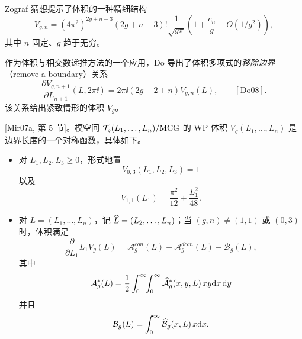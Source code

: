 
Zograf 猜想提示了体积的一种精细结构
\[
V_{g,n}=(4\pi^2)^{2g+n-3}(2g+n-3)!\frac{1}{\sqrt{g\pi}}\left(1+\frac{c_n}{g}+O(1/g^2)\right),
\]
其中 $n$ 固定、$g$ 趋于无穷。


作为体积与相交数递推方法的一个应用，Do 导出了体积多项式的\emph{移除边界}（remove a boundary）关系
\[
\frac{\partial V_{g,n+1}}{\partial L_{n+1}}(L,2\pi\ii)=2\pi\ii(2g-2+n)V_{g,n}(L),\qquad[\text{Do08}].
\]
该关系给出紧致情形的体积 $V_g$。


 [Mir07a, 第 5 节]。模空间 $\mathcal{T}_g(L_1,\dots,L_n)/\mathrm{MCG}$ 的 WP 体积 $V_g(L_1,\dots,L_n)$ 是边界长度的一个对称函数，具体如下。

\begin{itemize}[leftmargin=1.6em,itemsep=2pt,topsep=2pt]
\item 对 $L_1,L_2,L_3\ge 0$，形式地置
\[
V_{0,3}(L_1,L_2,L_3)=1
\]
以及
\[
V_{1,1}(L_1)=\frac{\pi^2}{12}+\frac{L_1^2}{48}.
\]
\item 对 $L=(L_1,\dots,L_n)$，记 $\widehat{L}=(L_2,\dots,L_n)$；当 $(g,n)\neq(1,1)$ 或 $(0,3)$ 时，体积满足
\[
\frac{\partial}{\partial L_1}L_1V_g(L)=\mathcal{A}^{con}_g(L)+\mathcal{A}^{dcon}_g(L)+\mathcal{B}_g(L),
\]
其中
\[
\mathcal{A}^{*}_g(L)=\frac{1}{2}\int_0^\infty\!\!\int_0^\infty\widehat{\mathcal{A}}^{*}_g(x,y,L)\,xy\mathrm{d} x\,\mathrm{d} y
\]
并且
\[
\mathcal{B}_g(L)=\int_0^\infty\widehat{\mathcal{B}}_g(x,L)\,x\mathrm{d} x.
\]
\end{itemize}

